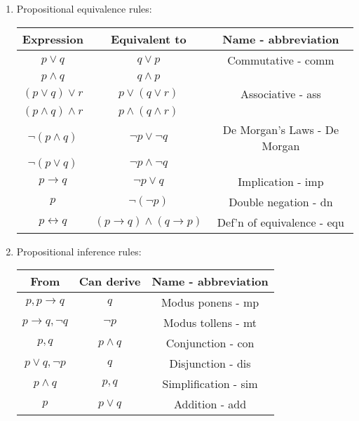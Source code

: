 \documentclass[nobib]{tufte-handout}
\let\biconditional\leftrightarrow
\begin{document}
\begin{enumerate}
    \item Propositional equivalence rules: 
    \begin{table}[ht]
        \centering
        \begin{tabular}{|c|c|c|}
        \hline
        Expression & Equivalent to & Name - abbreviation\\
        \hline
        $p \lor q$ & $q \lor p$ & Commutative - comm\\
        $p \land q$ & $q \land p $ &\\
        \hline
        $(p \lor q) \lor r$ &$p \lor (q \lor r)$ & Associative - ass\\
        $(p \land q) \land r$ &$p \land (q \land r)$ &\\
        \hline
        $\neg(p \wedge q)$ & $\neg p \vee \neg q$ & De Morgan's Laws - De Morgan\\
        $\neg(p \vee q)$ & $\neg p \wedge \neg q$ &\\
        \hline
        $p \rightarrow q$ & $\neg p \lor q$ & Implication - imp \\
        \hline
        $p$ & $\neg (\neg p)$ & Double negation - dn \\
        \hline
        $p \biconditional q$ & $(p \rightarrow q) \land (q \rightarrow p)$ & Def'n of equivalence - equ\\
        \hline
        \end{tabular}
    \end{table}
    \item Propositional inference rules: 
    \begin{table}[ht]
        \centering
        \begin{tabular}{|c|c|c|}
        \hline
        From & Can derive & Name - abbreviation\\
        \hline
        $p, p \rightarrow q$ & $q$ & Modus ponens - mp\\
        $p \rightarrow q, \neg q$ & $\neg p$ & Modus tollens - mt\\
        \hline
        $p, q$ & $p \land q$ & Conjunction - con\\
        \hline
        $p \lor q, \neg p$ & $q$ & Disjunction - dis\\
        \hline
        $p \land q$ & $p, q$ & Simplification - sim\\
        \hline
        $p$ & $p \lor q$ & Addition - add\\
        \hline
        \end{tabular}
    \end{table}
\end{enumerate}
\end{document}
